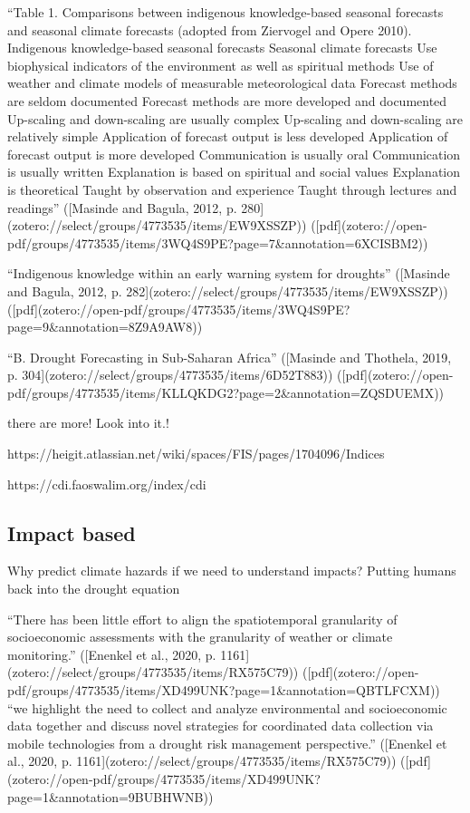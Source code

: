 {“Table 1. Comparisons between indigenous knowledge-based seasonal forecasts and seasonal climate forecasts (adopted from Ziervogel and Opere 2010). Indigenous knowledge-based seasonal forecasts Seasonal climate forecasts Use biophysical indicators of the environment as well as spiritual methods Use of weather and climate models of measurable meteorological data Forecast methods are seldom documented Forecast methods are more developed and documented Up-scaling and down-scaling are usually complex Up-scaling and down-scaling are relatively simple Application of forecast output is less developed Application of forecast output is more developed Communication is usually oral Communication is usually written Explanation is based on spiritual and social values Explanation is theoretical Taught by observation and experience Taught through lectures and readings” ([Masinde and Bagula, 2012, p. 280](zotero://select/groups/4773535/items/EW9XSSZP)) ([pdf](zotero://open-pdf/groups/4773535/items/3WQ4S9PE?page=7&annotation=6XCISBM2))

“Indigenous knowledge within an early warning system for droughts” ([Masinde and Bagula, 2012, p. 282](zotero://select/groups/4773535/items/EW9XSSZP)) ([pdf](zotero://open-pdf/groups/4773535/items/3WQ4S9PE?page=9&annotation=8Z9A9AW8))

“B. Drought Forecasting in Sub-Saharan Africa” ([Masinde and Thothela, 2019, p. 304](zotero://select/groups/4773535/items/6D52T883)) ([pdf](zotero://open-pdf/groups/4773535/items/KLLQKDG2?page=2&annotation=ZQSDUEMX))

there are more! Look into it.!

https://heigit.atlassian.net/wiki/spaces/FIS/pages/1704096/Indices

https://cdi.faoswalim.org/index/cdi

\subsection{Impact based}
Why predict climate hazards if we need to understand impacts? Putting humans back into the drought equation

“There has been little effort to align the spatiotemporal granularity of socioeconomic assessments with the granularity of weather or climate monitoring.” ([Enenkel et al., 2020, p. 1161](zotero://select/groups/4773535/items/RX575C79)) ([pdf](zotero://open-pdf/groups/4773535/items/XD499UNK?page=1&annotation=QBTLFCXM))
“we highlight the need to collect and analyze environmental and socioeconomic data together and discuss novel strategies for coordinated data collection via mobile technologies from a drought risk management perspective.” ([Enenkel et al., 2020, p. 1161](zotero://select/groups/4773535/items/RX575C79)) ([pdf](zotero://open-pdf/groups/4773535/items/XD499UNK?page=1&annotation=9BUBHWNB))

}
